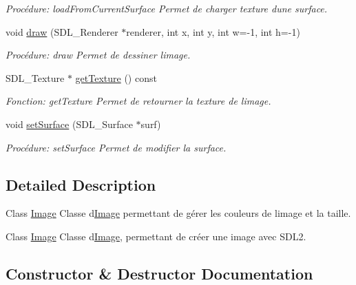 \begin{DoxyCompactItemize}
\begin{DoxyCompactList}\small\item\em Procédure\+: load\+From\+Current\+Surface Permet de charger texture d\textquotesingle{}une surface. \end{DoxyCompactList}\item 
void \hyperlink{classImage_a82d6936d466ba0161d8b9cbacf613de5}{draw} (S\+D\+L\+\_\+\+Renderer $\ast$renderer, int x, int y, int w=-\/1, int h=-\/1)
\begin{DoxyCompactList}\small\item\em Procédure\+: draw Permet de dessiner l\textquotesingle{}image. \end{DoxyCompactList}\item 
S\+D\+L\+\_\+\+Texture $\ast$ \hyperlink{classImage_ae9e27e310b4322d04366f2882f3a4242}{get\+Texture} () const
\begin{DoxyCompactList}\small\item\em Fonction\+: get\+Texture Permet de retourner la texture de l\textquotesingle{}image. \end{DoxyCompactList}\item 
void \hyperlink{classImage_a833f5d3b4b9f905320c6dffcc9b84b95}{set\+Surface} (S\+D\+L\+\_\+\+Surface $\ast$surf)
\begin{DoxyCompactList}\small\item\em Procédure\+: set\+Surface Permet de modifier la surface. \end{DoxyCompactList}\end{DoxyCompactItemize}


\subsection{Detailed Description}
Class \hyperlink{classImage}{Image} Classe d\textquotesingle{}\hyperlink{classImage}{Image} permettant de gérer les couleurs de l\textquotesingle{}image et la taille. 

Class \hyperlink{classImage}{Image} Classe d\textquotesingle{}\hyperlink{classImage}{Image}, permettant de créer une image avec S\+D\+L2. 

\subsection{Constructor \& Destructor Documentation}
\mbox{\label{classImage_a58edd1c45b4faeb5f789b0d036d02313}} 
